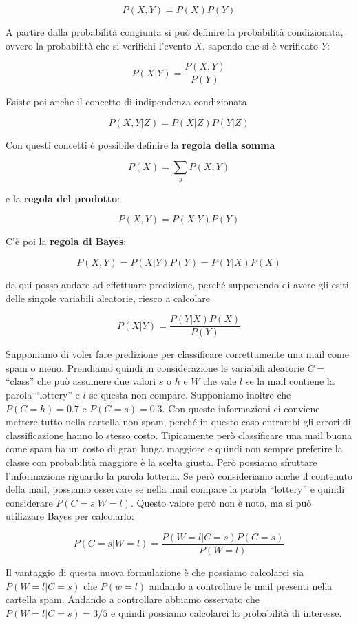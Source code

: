 $$
P(X,Y) = P(X)P(Y)
$$

\noindent A partire dalla probabilità congiunta si può definire la probabilità condizionata, ovvero la probabilità che si verifichi l'evento $X$, sapendo che si è verificato $Y$:

$$
P(X | Y) = \frac{P(X,Y)}{P(Y)}
$$

\noindent Esiste poi anche il concetto di indipendenza condizionata

$$
P(X,Y | Z) = P(X|Z) P(Y|Z)
$$

\noindent Con questi concetti è possibile definire la \textbf{regola della somma}

$$
P(X) = \sum\limits_{y} P(X,Y)
$$

\noindent e la \textbf{regola del prodotto}:

$$
P(X,Y) = P(X|Y)P(Y)
$$

\noindent C'è poi la \textbf{regola di Bayes}:

$$
P(X,Y) = P(X|Y)P(Y) = P(Y|X)P(X)
$$

\noindent da qui posso andare ad effettuare predizione, perché supponendo di avere gli esiti delle singole variabili aleatorie, riesco a calcolare

$$
P(X|Y) = \frac{P(Y|X)P(X)}{P(Y)}
$$

\noindent Supponiamo di voler fare predizione per classificare correttamente una mail come spam o meno. Prendiamo quindi in considerazione le variabili aleatorie $C = $ ``class'' che può assumere due valori $s$ o $h$ e $W$ che vale $l$ se la mail contiene la parola ``lottery'' e $\overline{l}$ se questa non compare.
Supponiamo inoltre che $P(C = h) = 0.7$ e $P(C = s) = 0.3$. Con queste informazioni ci conviene mettere tutto nella cartella non-spam, perché in questo caso entrambi gli errori di classificazione hanno lo stesso costo. Tipicamente però classificare una mail buona come spam ha un costo di gran lunga maggiore e quindi non sempre preferire la classe con probabilità maggiore è la scelta giusta.
Però possiamo sfruttare l'informazione riguardo la parola lotteria. Se però consideriamo anche il contenuto della mail, possiamo osservare se nella mail compare la parola ``lottery'' e quindi considerare $P(C = s | W = l)$. Questo valore però non è noto, ma si può utilizzare Bayes per calcolarlo:

$$
P(C = s | W = l) = \frac{P(W = l | C = s)P(C=s)}{P(W = l)}
$$

\noindent Il vantaggio di questa nuova formulazione è che possiamo calcolarci sia $P(W = l | C = s)$ che $P(w = l)$ andando a controllare le mail presenti nella cartella spam.
Andando a controllare abbiamo osservato che $P(W = l | C = s) = 3/5$ e quindi possiamo calcolarci la probabilità di interesse.

